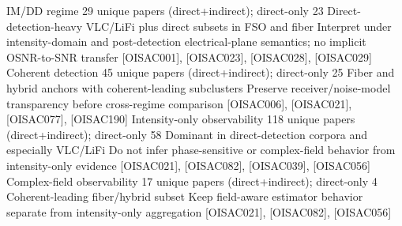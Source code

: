 {}\markdownRendererPipe{} IM/DD regime \markdownRendererPipe{} 29 unique papers (direct+indirect); direct-only 23 \markdownRendererPipe{} Direct-detection-heavy VLC/LiFi plus direct subsets in FSO and fiber \markdownRendererPipe{} Interpret under intensity-domain and post-detection electrical-plane semantics; no implicit OSNR-to-SNR transfer \markdownRendererPipe{} [O\markdownRendererUnderscore{}ISAC\markdownRendererUnderscore{}001], [O\markdownRendererUnderscore{}ISAC\markdownRendererUnderscore{}023], [O\markdownRendererUnderscore{}ISAC\markdownRendererUnderscore{}028], [O\markdownRendererUnderscore{}ISAC\markdownRendererUnderscore{}029] \markdownRendererPipe{}\markdownRendererSoftLineBreak
{}\markdownRendererPipe{} Coherent detection \markdownRendererPipe{} 45 unique papers (direct+indirect); direct-only 25 \markdownRendererPipe{} Fiber and hybrid anchors with coherent-leading subclusters \markdownRendererPipe{} Preserve receiver/noise-model transparency before cross-regime comparison \markdownRendererPipe{} [O\markdownRendererUnderscore{}ISAC\markdownRendererUnderscore{}006], [O\markdownRendererUnderscore{}ISAC\markdownRendererUnderscore{}021], [O\markdownRendererUnderscore{}ISAC\markdownRendererUnderscore{}077], [O\markdownRendererUnderscore{}ISAC\markdownRendererUnderscore{}190] \markdownRendererPipe{}\markdownRendererSoftLineBreak
{}\markdownRendererPipe{} Intensity-only observability \markdownRendererPipe{} 118 unique papers (direct+indirect); direct-only 58 \markdownRendererPipe{} Dominant in direct-detection corpora and especially VLC/LiFi \markdownRendererPipe{} Do not infer phase-sensitive or complex-field behavior from intensity-only evidence \markdownRendererPipe{} [O\markdownRendererUnderscore{}ISAC\markdownRendererUnderscore{}021], [O\markdownRendererUnderscore{}ISAC\markdownRendererUnderscore{}082], [O\markdownRendererUnderscore{}ISAC\markdownRendererUnderscore{}039], [O\markdownRendererUnderscore{}ISAC\markdownRendererUnderscore{}056] \markdownRendererPipe{}\markdownRendererSoftLineBreak
{}\markdownRendererPipe{} Complex-field observability \markdownRendererPipe{} 17 unique papers (direct+indirect); direct-only 4 \markdownRendererPipe{} Coherent-leading fiber/hybrid subset \markdownRendererPipe{} Keep field-aware estimator behavior separate from intensity-only aggregation \markdownRendererPipe{} [O\markdownRendererUnderscore{}ISAC\markdownRendererUnderscore{}021], [O\markdownRendererUnderscore{}ISAC\markdownRendererUnderscore{}082], [O\markdownRendererUnderscore{}ISAC\markdownRendererUnderscore{}056] \markdownRendererPipe{}\markdownRendererSoftLineBreak
